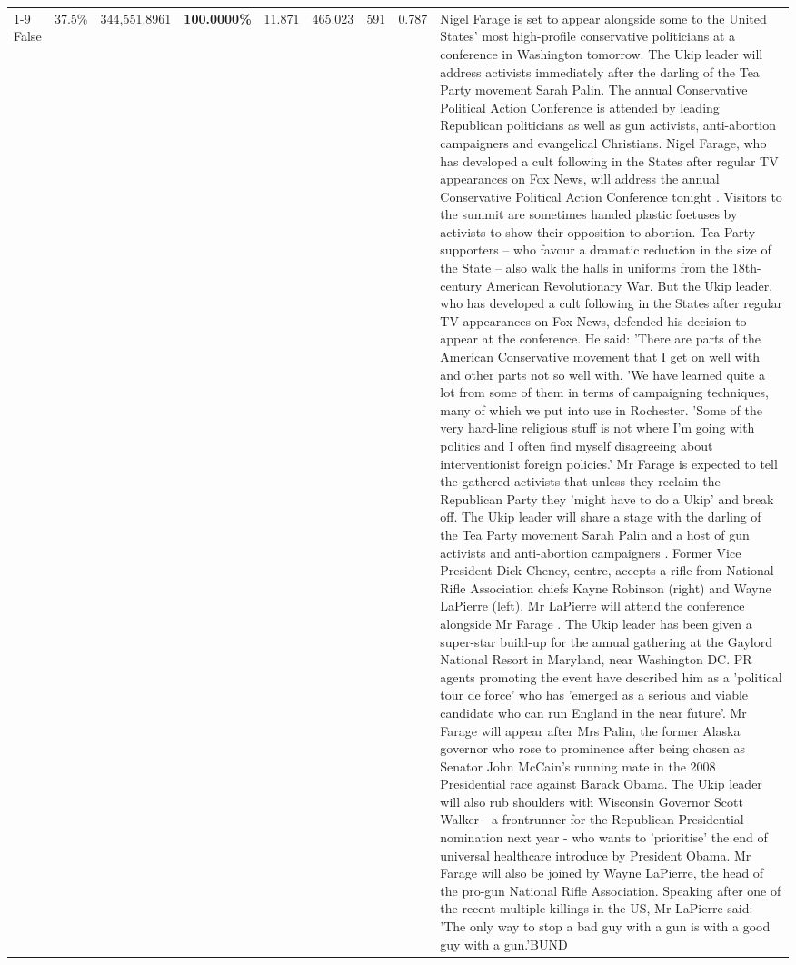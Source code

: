 \begin{table}[H]
\begin{tabular}{lllrlllll}
\cline{1-9}
False & 37.5\% & 344,551.8961 & \bfseries \color{red} 100.0000\% & 11.871 & 465.023 & 591 & 0.787 & Nigel Farage is set to appear alongside some to the United States' most high-profile conservative politicians at a conference in Washington tomorrow. The Ukip leader will address activists immediately after the darling of the Tea Party movement Sarah Palin. The annual Conservative Political Action Conference is attended by leading Republican politicians as well as gun activists, anti-abortion campaigners and evangelical Christians. Nigel Farage, who has developed a cult following in the States after regular TV appearances on Fox News, will address the annual Conservative Political Action Conference tonight . Visitors to the summit are sometimes handed plastic foetuses by activists to show their opposition to abortion. Tea Party supporters – who favour a dramatic reduction in the size of the State – also walk the halls in uniforms from the 18th-century American Revolutionary War. But the Ukip leader, who has developed a cult following in the States after regular TV appearances on Fox News, defended his decision to appear at the conference. He said: 'There are parts of the American Conservative movement that I get on well with and other parts not so well with. 'We have learned quite a lot from some of them in terms of campaigning techniques, many of which we put into use in Rochester. 'Some of the very hard-line religious stuff is not where I'm going with politics and I often find myself disagreeing about interventionist foreign policies.' Mr Farage is expected to tell the gathered activists that unless they reclaim the Republican Party they 'might have to do a Ukip' and break off. The Ukip leader will share a stage with the darling of the Tea Party movement Sarah Palin and a host of gun activists and anti-abortion campaigners . Former Vice President Dick Cheney, centre, accepts a rifle from National Rifle Association chiefs Kayne Robinson (right) and Wayne LaPierre (left). Mr LaPierre will attend the conference alongside Mr Farage . The Ukip leader has been given a super-star build-up for the annual gathering at the Gaylord National Resort in Maryland, near Washington DC. PR agents promoting the event have described him as a 'political tour de force' who has 'emerged as a serious and viable candidate who can run England in the near future'. Mr Farage will appear after Mrs Palin, the former Alaska governor who rose to prominence after being chosen as Senator John McCain's running mate in the 2008 Presidential race against Barack Obama. The Ukip leader will also rub shoulders with Wisconsin Governor Scott Walker - a frontrunner for the Republican Presidential nomination next year - who wants to 'prioritise' the end of universal healthcare introduce by President Obama. Mr Farage will also be joined by Wayne LaPierre, the head of the pro-gun National Rifle Association. Speaking after one of the recent multiple killings in the US, Mr LaPierre said: 'The only way to stop a bad guy with a gun is with a good guy with a gun.'BUND \\

\end{tabular}
\end{table}
